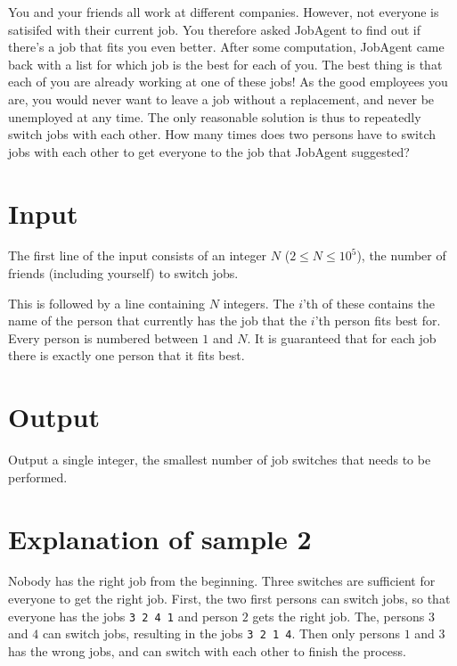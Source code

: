 You and your friends all work at different companies.
However, not everyone is satisifed with their current job.
You therefore asked JobAgent to find out if there's a job that fits you even better.
After some computation, JobAgent came back with a list for which job is the best for each of you.
The best thing is that each of you are already working at one of these jobs!
As the good employees you are, you would never want to leave a job without a replacement, and never be unemployed at any time.
The only reasonable solution is thus to repeatedly switch jobs with each other.
How many times does two persons have to switch jobs with each other to get everyone to the job that JobAgent suggested?

\section*{Input}
The first line of the input consists of an integer $N$ ($2 \le N \le 10^5$), the number of friends (including yourself) to switch jobs.

This is followed by a line containing $N$ integers.
The $i$'th of these contains the name of the person that currently has the job that the $i$'th person fits best for.
Every person is numbered between $1$ and $N$.
It is guaranteed that for each job there is exactly one person that it fits best.

\section*{Output}
Output a single integer, the smallest number of job switches that needs to be performed.

\section*{Explanation of sample 2}
Nobody has the right job from the beginning.
Three switches are sufficient for everyone to get the right job.
First, the two first persons can switch jobs, so that everyone has the jobs \texttt{3 2 4 1} and person $2$ gets the right job.
The, persons $3$ and $4$ can switch jobs, resulting in the jobs \texttt{3 2 1 4}.
Then only persons $1$ and $3$ has the wrong jobs, and can switch with each other to finish the process.
